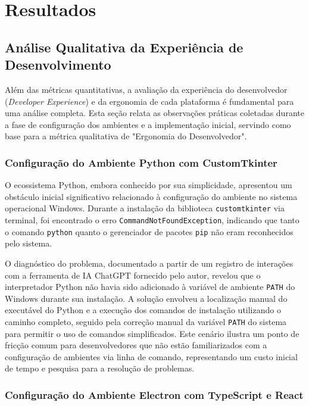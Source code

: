 
\chapter{Resultados}\label{cap:resultados}

\section{Análise Qualitativa da Experiência de Desenvolvimento}
\label{sec:analise_qualitativa}

Além das métricas quantitativas, a avaliação da experiência do desenvolvedor (\textit{Developer Experience}) e da ergonomia de cada plataforma é fundamental para uma análise completa. Esta seção relata as observações práticas coletadas durante a fase de configuração dos ambientes e a implementação inicial, servindo como base para a métrica qualitativa de "Ergonomia do Desenvolvedor".

\subsection{Configuração do Ambiente Python com CustomTkinter}

O ecossistema Python, embora conhecido por sua simplicidade, apresentou um obstáculo inicial significativo relacionado à configuração do ambiente no sistema operacional Windows. Durante a instalação da biblioteca \texttt{customtkinter} via terminal, foi encontrado o erro \texttt{CommandNotFoundException}, indicando que tanto o comando \texttt{python} quanto o gerenciador de pacotes \texttt{pip} não eram reconhecidos pelo sistema.

O diagnóstico do problema, documentado a partir de um registro de interações com a ferramenta de IA ChatGPT fornecido pelo autor, revelou que o interpretador Python não havia sido adicionado à variável de ambiente \texttt{PATH} do Windows durante sua instalação. A solução envolveu a localização manual do executável do Python e a execução dos comandos de instalação utilizando o caminho completo, seguido pela correção manual da variável \texttt{PATH} do sistema para permitir o uso de comandos simplificados. Este cenário ilustra um ponto de fricção comum para desenvolvedores que não estão familiarizados com a configuração de ambientes via linha de comando, representando um custo inicial de tempo e pesquisa para a resolução de problemas.

\subsection{Configuração do Ambiente Electron com TypeScript e React}

